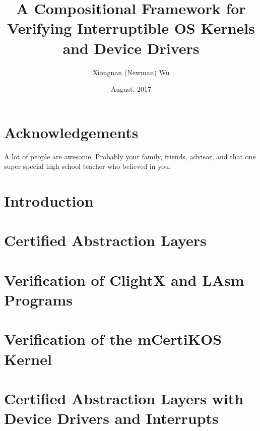 \documentclass[letterpaper,11pt]{yalephd}
\begin{document}
\title{A Compositional Framework for Verifying Interruptible OS Kernels and Device Drivers}
\author{Xiongnan (Newman) Wu}
\date{August, 2017} %

\frontmatter

\begin{abstract}

\end{abstract}


\maketitle
{} %
\tableofcontents
\listoffigures %
\listoftables %

\chapter{Acknowledgements} %
A lot of people are awesome. Probably your family, friends, 
advisor, and that one super special high school teacher who
believed in you.

\mainmatter

\chapter{Introduction}

\chapter{Certified Abstraction Layers}
\label{chapter:framework}


\chapter{Verification of ClightX and LAsm Programs}
\label{chapter:automation}


\chapter{Verification of the mCertiKOS Kernel}
\label{chapter:sequential}


\chapter{Certified Abstraction Layers with Device Drivers and Interrupts}
\label{chapter:driver}
\end{document}
